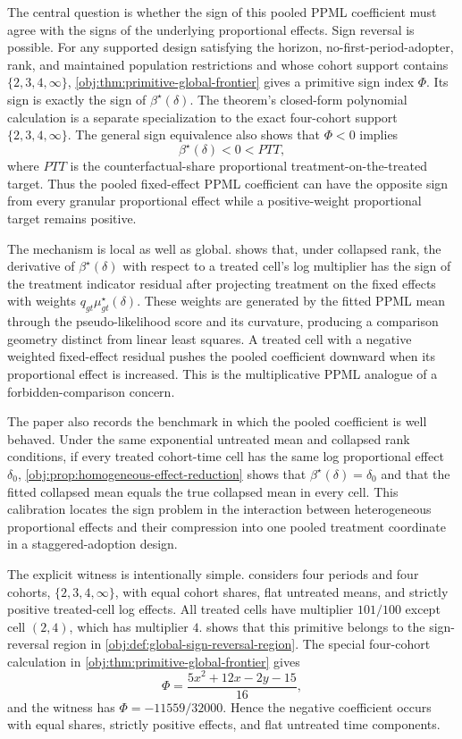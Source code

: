 \documentclass[11pt]{article}
\begin{document}
The central question is whether the sign of this pooled PPML coefficient must agree with the signs of the underlying proportional effects. Sign reversal is possible. For any supported design satisfying the horizon, no-first-period-adopter, rank, and maintained population restrictions and whose cohort support contains \(\{2,3,4,\infty\}\), \cref{obj:thm:primitive-global-frontier} gives a primitive sign index \(\Phi\). Its sign is exactly the sign of \(\beta^\star(\delta)\). The theorem's closed-form polynomial calculation is a separate specialization to the exact four-cohort support \(\{2,3,4,\infty\}\). The general sign equivalence also shows that \(\Phi<0\) implies
\[
\beta^\star(\delta)<0<PTT,
\]
where \(PTT\) is the counterfactual-share proportional treatment-on-the-treated target. Thus the pooled fixed-effect PPML coefficient can have the opposite sign from every granular proportional effect while a positive-weight proportional target remains positive.

The mechanism is local as well as global.  shows that, under collapsed rank, the derivative of \(\beta^\star(\delta)\) with respect to a treated cell's log multiplier has the sign of the treatment indicator residual after projecting treatment on the fixed effects with weights \(q_{gt}\mu^\star_{gt}(\delta)\). These weights are generated by the fitted PPML mean through the pseudo-likelihood score and its curvature, producing a comparison geometry distinct from linear least squares. A treated cell with a negative weighted fixed-effect residual pushes the pooled coefficient downward when its proportional effect is increased. This is the multiplicative PPML analogue of a forbidden-comparison concern.

The paper also records the benchmark in which the pooled coefficient is well behaved. Under the same exponential untreated mean and collapsed rank conditions, if every treated cohort-time cell has the same log proportional effect \(\delta_0\), \cref{obj:prop:homogeneous-effect-reduction} shows that \(\beta^\star(\delta)=\delta_0\) and that the fitted collapsed mean equals the true collapsed mean in every cell. This calibration locates the sign problem in the interaction between heterogeneous proportional effects and their compression into one pooled treatment coordinate in a staggered-adoption design.

The explicit witness is intentionally simple.  considers four periods and four cohorts, \(\{2,3,4,\infty\}\), with equal cohort shares, flat untreated means, and strictly positive treated-cell log effects. All treated cells have multiplier \(101/100\) except cell \((2,4)\), which has multiplier \(4\).  shows that this primitive belongs to the sign-reversal region in \cref{obj:def:global-sign-reversal-region}. The special four-cohort calculation in \cref{obj:thm:primitive-global-frontier} gives
\[
\Phi=\frac{5x^2+12x-2y-15}{16},
\]
and the witness has \(\Phi=-11559/32000\). Hence the negative coefficient occurs with equal shares, strictly positive effects, and flat untreated time components.
\end{document}
